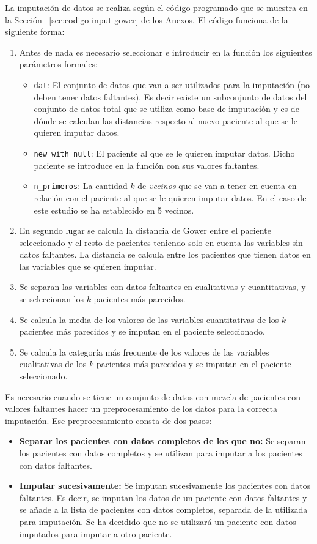 La imputación de datos se realiza según el código programado que se muestra en la Sección ~\ref{sec:codigo-input-gower} de los Anexos. El código funciona de la siguiente forma: 
\begin{enumerate}
    \item Antes de nada es necesario seleccionar e introducir en la función los siguientes parámetros formales: 
    \begin{itemize}
        \item \texttt{dat}: El conjunto de datos que van a ser utilizados para la imputación (no deben tener datos faltantes). Es decir existe un subconjunto de datos del conjunto de datos total que se utiliza como base de imputación y es de dónde se calculan las distancias respecto al nuevo paciente al que se le quieren imputar datos.
        \item \texttt{new\_with\_null}: El paciente al que se le quieren imputar datos. Dicho paciente se introduce en la función con sus valores faltantes.
        \item \texttt{n\_primeros}: La cantidad $k$ de \textit{vecinos} que se van a tener en cuenta en relación con el paciente al que se le quieren imputar datos. En el caso de este estudio se ha establecido en 5 vecinos.
    \end{itemize}
    \item En segundo lugar se calcula la distancia de Gower entre el paciente seleccionado y el resto de pacientes teniendo solo en cuenta las variables sin datos faltantes. La distancia se calcula entre los pacientes que tienen datos en las variables que se quieren imputar.
    \item Se separan las variables con datos faltantes en cualitativas y cuantitativas, y se seleccionan los $k$ pacientes más parecidos.
    \item Se calcula la media de los valores de las variables cuantitativas de los $k$ pacientes más parecidos y se imputan en el paciente seleccionado.
    \item Se calcula la categoría más frecuente de los valores de las variables cualitativas de los $k$ pacientes más parecidos y se imputan en el paciente seleccionado.
\end{enumerate}

Es necesario cuando se tiene un conjunto de datos con mezcla de pacientes con valores faltantes hacer un preprocesamiento de los datos para la correcta imputación. Ese preprocesamiento consta de dos pasos: 
\begin{itemize}
    \item \textbf{Separar los pacientes con datos completos de los que no:} Se separan los pacientes con datos completos y se utilizan para imputar a los pacientes con datos faltantes.
    \item \textbf{Imputar sucesivamente:} Se imputan sucesivamente los pacientes con datos faltantes. Es decir, se imputan los datos de un paciente con datos faltantes y se añade a la lista de pacientes con datos completos, separada de la utilizada para imputación. Se ha decidido que no se utilizará un paciente con datos imputados para imputar a otro paciente.
\end{itemize}

